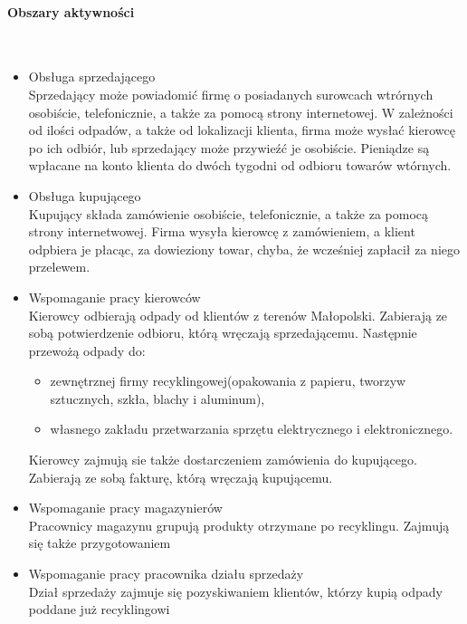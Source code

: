 


\paragraph{Obszary aktywności} \ \\
\begin{itemize}
	\item Obsługa sprzedającego \\
	Sprzedający może powiadomić firmę o posiadanych surowcach wtrórnych osobiście, telefonicznie, a także za pomocą strony internetowej. W zależności od ilości odpadów, a także od lokalizacji klienta, firma może wysłać kierowcę po ich odbiór, lub sprzedający może przywieźć je osobiście. Pieniądze są wpłacane na konto klienta do dwóch tygodni od odbioru towarów wtórnych.
	\item Obsługa kupującego \\
	Kupujący składa zamówienie osobiście, telefonicznie, a także za pomocą strony internetwowej. Firma wysyła kierowcę z zamówieniem, a klient odpbiera je płacąc, za dowieziony towar, chyba, że wcześniej zapłacił za niego przelewem.
	\item Wspomaganie pracy kierowców \\
	Kierowcy odbierają odpady od klientów z terenów Małopolski. Zabierają ze sobą potwierdzenie odbioru, którą wręczają sprzedającemu. Następnie przewożą odpady do:
		\begin{itemize}
			\item zewnętrznej firmy recyklingowej(opakowania z papieru, tworzyw sztucznych, szkła, blachy i aluminum),
			\item własnego zakładu przetwarzania sprzętu elektrycznego i elektronicznego.
		\end{itemize}
	Kierowcy zajmują sie także dostarczeniem zamówienia do kupującego. Zabierają ze sobą fakturę, którą wręczają kupującemu.
	\item Wspomaganie pracy magazynierów \\
	Pracownicy magazynu grupują produkty otrzymane po recyklingu. Zajmują się także przygotowaniem 
	\item Wspomaganie pracy pracownika działu sprzedaży \\
	Dział sprzedaży zajmuje się pozyskiwaniem klientów, którzy kupią odpady poddane już recyklingowi
\end{itemize}